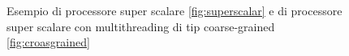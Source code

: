 \begin{figure}[htb]
\centering
{}
\caption{Esempio di processore super scalare \ref{fig:superscalar} e di processore super scalare con multithreading di tip coarse-grained \ref{fig:croasgrained}}
\end{figure}
